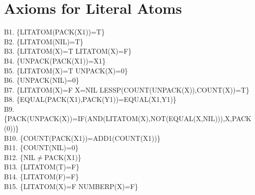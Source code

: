\documentclass[10pt]{book}
\newenvironment{pubasis}{\begin{flushleft}}{\end{flushleft}}
\begin{document}
\section{Axioms for Literal Atoms}
\begin{pubasis}
B1.   \{LITATOM(PACK(X1))=T\}\\

B2.   \{LITATOM(NIL)=T\}\\

B3.   \{LITATOM(X)=T LITATOM(X)=F\}\\

B4.   \{UNPACK(PACK(X1))=X1\}\\

B5.   \{LITATOM(X)=T UNPACK(X)=0\}\\

B6.   \{UNPACK(NIL)=0\}\\

B7.   \{LITATOM(X)=F X=NIL LESSP(COUNT(UNPACK(X)),COUNT(X))=T\}\\

B8.   \{EQUAL(PACK(X1),PACK(Y1))=EQUAL(X1,Y1)\}\\

B9.   \{PACK(UNPACK(X))=IF(AND(LITATOM(X),NOT(EQUAL(X,NIL))),X,PACK(0))\}\\

B10.  \{COUNT(PACK(X1))=ADD1(COUNT(X1))\}\\

B11.  \{COUNT(NIL)=0\}\\

B12.  \{NIL$\neq$PACK(X1)\}\\

B13.  \{LITATOM(T)=F\}\\

B14.  \{LITATOM(F)=F\}\\

B15.  \{LITATOM(X)=F NUMBERP(X)=F\}\\
\end{pubasis}
\end{document}
